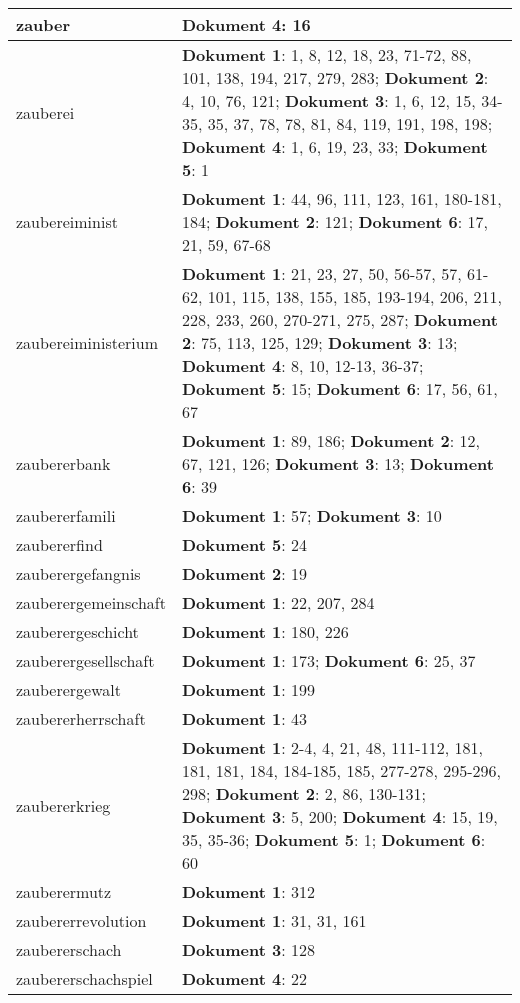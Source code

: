\documentclass[a5paper]{article}
\begin{document}
\begin{longtable}[l]{|l|p{3in}|}
\hline
zauber & \textbf{Dokument 4}: 16 \\
\hline
zauberei & \textbf{Dokument 1}: 1, 8, 12, 18, 23, 71-72, 88, 101, 138, 194, 217, 279, 283; \textbf{Dokument 2}: 4, 10, 76, 121; \textbf{Dokument 3}: 1, 6, 12, 15, 34-35, 35, 37, 78, 78, 81, 84, 119, 191, 198, 198; \textbf{Dokument 4}: 1, 6, 19, 23, 33; \textbf{Dokument 5}: 1 \\
\hline
zaubereiminist & \textbf{Dokument 1}: 44, 96, 111, 123, 161, 180-181, 184; \textbf{Dokument 2}: 121; \textbf{Dokument 6}: 17, 21, 59, 67-68 \\
\hline
zaubereiministerium & \textbf{Dokument 1}: 21, 23, 27, 50, 56-57, 57, 61-62, 101, 115, 138, 155, 185, 193-194, 206, 211, 228, 233, 260, 270-271, 275, 287; \textbf{Dokument 2}: 75, 113, 125, 129; \textbf{Dokument 3}: 13; \textbf{Dokument 4}: 8, 10, 12-13, 36-37; \textbf{Dokument 5}: 15; \textbf{Dokument 6}: 17, 56, 61, 67 \\
\hline
zaubererbank & \textbf{Dokument 1}: 89, 186; \textbf{Dokument 2}: 12, 67, 121, 126; \textbf{Dokument 3}: 13; \textbf{Dokument 6}: 39 \\
\hline
zaubererfamili & \textbf{Dokument 1}: 57; \textbf{Dokument 3}: 10 \\
\hline
zaubererfind & \textbf{Dokument 5}: 24 \\
\hline
zauberergefangnis & \textbf{Dokument 2}: 19 \\
\hline
zauberergemeinschaft & \textbf{Dokument 1}: 22, 207, 284 \\
\hline
zauberergeschicht & \textbf{Dokument 1}: 180, 226 \\
\hline
zauberergesellschaft & \textbf{Dokument 1}: 173; \textbf{Dokument 6}: 25, 37 \\
\hline
zauberergewalt & \textbf{Dokument 1}: 199 \\
\hline
zaubererherrschaft & \textbf{Dokument 1}: 43 \\
\hline
zaubererkrieg & \textbf{Dokument 1}: 2-4, 4, 21, 48, 111-112, 181, 181, 181, 184, 184-185, 185, 277-278, 295-296, 298; \textbf{Dokument 2}: 2, 86, 130-131; \textbf{Dokument 3}: 5, 200; \textbf{Dokument 4}: 15, 19, 35, 35-36; \textbf{Dokument 5}: 1; \textbf{Dokument 6}: 60 \\
\hline
zauberermutz & \textbf{Dokument 1}: 312 \\
\hline
zaubererrevolution & \textbf{Dokument 1}: 31, 31, 161 \\
\hline
zaubererschach & \textbf{Dokument 3}: 128 \\
\hline
zaubererschachspiel & \textbf{Dokument 4}: 22 \\

\end{longtable}
\end{document}
